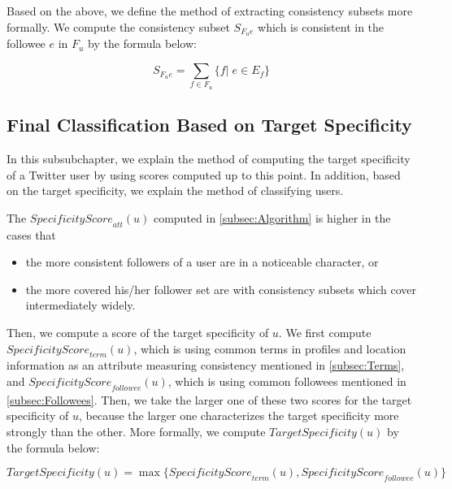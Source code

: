 Based on the above, we define the method of extracting consistency
subsets more formally.  We compute the consistency subset $S_{F_ue}$
which is consistent in the followee $e$ in $F_u$ by the formula below:

\vspace{-1ex}
\[
 S_{F_ue} =  \sum_{f \in F_u} \{f|\;e \in E_f \}
\]
\vspace{-2ex}


\subsection{Final Classification Based on Target Specificity}
\label{subsubsec:Final Classification}

In this subsubchapter, we explain the method of computing the target
specificity of a Twitter user by using scores computed up to this
point.  In addition, based on the target specificity, we explain the
method of classifying users.

The $\mathit{SpecificityScore}_{{\mathit{att}}}(u)$ computed in
\ref{subsec:Algorithm} is higher in the cases that

\begin{itemize}
\item the more consistent followers of a user are in a noticeable
      character, or
\item the more covered his/her follower set are with consistency
      subsets which cover intermediately widely.
\end{itemize}

Then, we compute a score of the target specificity of $u$. We first
compute $\mathit{SpecificityScore}_{{\mathit{term}}}(u)$, which is using
common terms in profiles and location information as an attribute
measuring consistency mentioned in \ref{subsec:Terms}, and
$\mathit{SpecificityScore}_{{\mathit{followee}}}(u)$, which is using
common followees mentioned in \ref{subsec:Followees}.  Then, we take the
larger one of these two scores for the target specificity of $u$,
because the larger one characterizes the target specificity more
strongly than the other.  More formally, we compute
$\mathit{TargetSpecificity}(u)$ by the formula below:

\vspace{-4ex}
\[
 \mathit{TargetSpecificity}(u) = \max \{
 \mathit{SpecificityScore}_{{\mathit{term}}}(u),
 \mathit{SpecificityScore}_{{\mathit{followee}}}(u)\}
\]
\vspace{-4ex}

